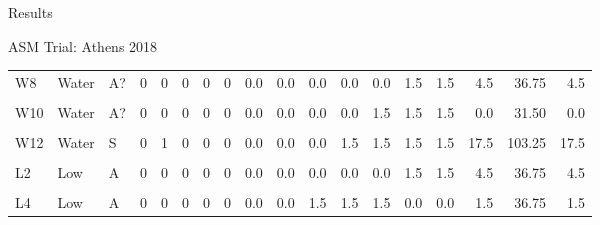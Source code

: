 \documentclass[
  ignorenonframetext,
]{beamer}
\begin{document}
\begin{frame}{Results}
\begin{block}{ASM Trial: Athens 2018}
\begin{table}
{\begin{tabular}[t]{lllrrrrrrrrrrrrrrr}
W8 & Water & A? & 0 & 0 & 0 & 0 & 0 & 0.0 & 0.0 & 0.0 & 0.0 & 0.0 & 1.5 & 1.5 & 4.5 & 36.75 & 4.5\\
\cellcolor{gray!6}{W9} & \cellcolor{gray!6}{Water} & \cellcolor{gray!6}{A} & \cellcolor{gray!6}{0} & \cellcolor{gray!6}{0} & \cellcolor{gray!6}{0} & \cellcolor{gray!6}{0} & \cellcolor{gray!6}{0} & \cellcolor{gray!6}{0.0} & \cellcolor{gray!6}{0.0} & \cellcolor{gray!6}{0.0} & \cellcolor{gray!6}{1.5} & \cellcolor{gray!6}{1.5} & \cellcolor{gray!6}{1.5} & \cellcolor{gray!6}{1.5} & \cellcolor{gray!6}{0.0} & \cellcolor{gray!6}{42.00} & \cellcolor{gray!6}{0.0}\\
W10 & Water & A? & 0 & 0 & 0 & 0 & 0 & 0.0 & 0.0 & 0.0 & 0.0 & 1.5 & 1.5 & 1.5 & 0.0 & 31.50 & 0.0\\
\addlinespace
\cellcolor{gray!6}{W11} & \cellcolor{gray!6}{Water} & \cellcolor{gray!6}{A?} & \cellcolor{gray!6}{0} & \cellcolor{gray!6}{0} & \cellcolor{gray!6}{0} & \cellcolor{gray!6}{0} & \cellcolor{gray!6}{0} & \cellcolor{gray!6}{0.0} & \cellcolor{gray!6}{0.0} & \cellcolor{gray!6}{1.5} & \cellcolor{gray!6}{0.0} & \cellcolor{gray!6}{0.0} & \cellcolor{gray!6}{1.5} & \cellcolor{gray!6}{1.5} & \cellcolor{gray!6}{1.5} & \cellcolor{gray!6}{36.75} & \cellcolor{gray!6}{1.5}\\
W12 & Water & S & 0 & 1 & 0 & 0 & 0 & 0.0 & 0.0 & 0.0 & 1.5 & 1.5 & 1.5 & 1.5 & 17.5 & 103.25 & 17.5\\
\cellcolor{gray!6}{L1} & \cellcolor{gray!6}{Low} & \cellcolor{gray!6}{A} & \cellcolor{gray!6}{0} & \cellcolor{gray!6}{0} & \cellcolor{gray!6}{0} & \cellcolor{gray!6}{0} & \cellcolor{gray!6}{0} & \cellcolor{gray!6}{0.0} & \cellcolor{gray!6}{0.0} & \cellcolor{gray!6}{0.0} & \cellcolor{gray!6}{0.0} & \cellcolor{gray!6}{1.5} & \cellcolor{gray!6}{4.5} & \cellcolor{gray!6}{1.5} & \cellcolor{gray!6}{0.0} & \cellcolor{gray!6}{52.50} & \cellcolor{gray!6}{0.0}\\
L2 & Low & A & 0 & 0 & 0 & 0 & 0 & 0.0 & 0.0 & 0.0 & 0.0 & 0.0 & 1.5 & 1.5 & 4.5 & 36.75 & 4.5\\
\cellcolor{gray!6}{L3} & \cellcolor{gray!6}{Low} & \cellcolor{gray!6}{S} & \cellcolor{gray!6}{0} & \cellcolor{gray!6}{0} & \cellcolor{gray!6}{0} & \cellcolor{gray!6}{0} & \cellcolor{gray!6}{0} & \cellcolor{gray!6}{0.0} & \cellcolor{gray!6}{0.0} & \cellcolor{gray!6}{0.0} & \cellcolor{gray!6}{4.5} & \cellcolor{gray!6}{1.5} & \cellcolor{gray!6}{4.5} & \cellcolor{gray!6}{0.0} & \cellcolor{gray!6}{1.5} & \cellcolor{gray!6}{78.75} & \cellcolor{gray!6}{1.5}\\
\addlinespace
L4 & Low & A & 0 & 0 & 0 & 0 & 0 & 0.0 & 0.0 & 1.5 & 1.5 & 1.5 & 0.0 & 0.0 & 1.5 & 36.75 & 1.5\\

\end{tabular}}
\end{table}
\end{block}
\end{frame}
\end{document}
